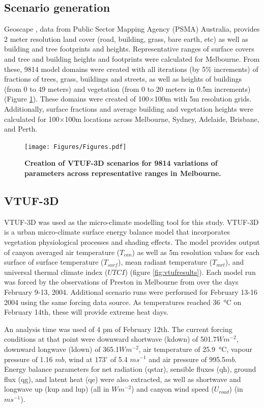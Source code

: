 \documentclass[final,3p,times,authoryear]{elsarticle}
\begin{document}
\subsection{Scenario generation}\label{sec:methodsgen}
Geoscape \citep{Geoscape2020}, data from Public Sector Mapping Agency (PSMA) Australia, provides 2 meter resolution land cover (road, building, grass, bare earth, etc) as well as building and tree footprints and heights. Representative ranges of surface covers and tree and building heights and footprints were calculated for Melbourne. From these, 9814 model domains were created with all iterations (by 5\% increments) of fractions of trees, grass, buildings and streets, as well as heights of buildings (from 0 to 49 meters) and vegetation (from 0 to 20 meters in 0.5m increments) (Figure \ref{fig:scenarios}). These domains were created of 100$\times$100m with 5m resolution grids. Additionally, surface fractions and average building and vegetation heights were calculated for 100$\times$100m locations across Melbourne, Sydney, Adelaide, Brisbane, and Perth.


\begin{figure}
\centering
\texttt{[image: Figures/Figures.pdf]}
\caption{\bf Creation of VTUF-3D scenarios for 9814 variations of parameters across representative ranges in Melbourne.}
 \label{fig:scenarios}
\end{figure} 



\subsection{VTUF-3D}\label{sec:methodsvtuf}
VTUF-3D \citep{Nice2018a} was used as the micro-climate modelling tool for this study. VTUF-3D is a urban micro-climate surface energy balance model that incorporates vegetation physiological processes and shading effects. The model provides output of canyon averaged air temperature ($T_{can}$) as well as 5m resolution values for each surface of surface temperature ($T_{surf}$), mean radiant temperature ($T_{mrt}$), and universal thermal climate index ($UTCI$) (figure \ref{fig:vtufresults}). Each model run was forced by the observations of Preston in Melbourne from \cite{Coutts2007} over the days February 9-13, 2004. Additional scenario runs were performed for February 13-16 2004 using the same forcing data source. As temperatures reached 36\SI{}{\degreeCelsius} on February 14th, these will provide extreme heat days.

An analysis time was used of  4 pm of February 12th. The current forcing conditions at that point were downward shortwave (\gls{kdown}) of 501.7$Wm^{-2}$, downward longwave (\gls{ldown}) of 365.1$Wm^{-2}$, air temperature of 25.9\SI{}{\degreeCelsius}, vapour pressure of 1.16 $mb$, wind at 173$^{\circ}$ of 5.4 $ms^{-1}$ and air pressure of 995.5$mb$. Energy balance parameters for net radiation (\gls{qstar}), sensible fluxes (\gls{qh}), ground flux (\gls{qg}), and latent heat (\gls{qe}) were also extracted, as well as shortwave and longwave up (\gls{kup} and \gls{lup}) (all in $Wm^{-2}$) and canyon wind speed ($U_{road}$) (in $ms^{-1}$).
\end{document}
